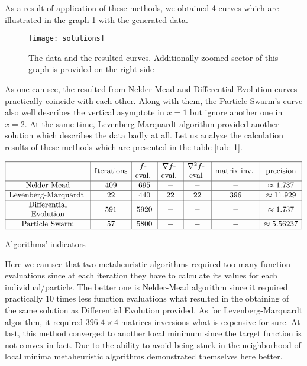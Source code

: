 \documentclass[12pt, bachelor, substylefile = algo_title.rtx]{disser}
\makeatletter
\newcommand{\specialcell}[2][c]{%
  \begin{tabular}[#1]{@{}c@{}}#2\end{tabular}}
\theoremstyle{definition}
\makeatother
\begin{document}
As a result of application of these methods, we obtained 4 curves which are illustrated in the graph \ref{fig: 1} with the generated data.

\begin{figure}[h]
\begin{center}
\texttt{[image: solutions]}
\caption{The data and the resulted curves. Additionally zoomed sector of this graph is provided on the right side}
\label{fig: 1}
\end{center}
\end{figure}
 
As one can see, the resulted from Nelder-Mead and Differential Evolution curves practically coincide with each other. Along with them, the Particle Swarm's curve also well describes the vertical asymptote in $x = 1$ but ignore another one in $x = 2$. At the same time, Levenberg-Marquardt algorithm provided another solution which describes the data badly at all.
Let us analyze the calculation results of these methods which are presented in the table 
\ref{tab: 1}.


\begin{table}[h]
$$
\begin{array}{|c|c|c|c|c|c|c|}
\hline
 & \text{Iterations} & \text{\specialcell{ $f$-\\eval.} }& \text{\specialcell{ $\nabla f$-\\eval.} } & \text{\specialcell{ $\nabla^2 f$-\\eval} } & \text{\specialcell{ matrix inv. } } &\text{precision}\\
\hline
\text{Nelder-Mead} & 409 & 695 & - & - & - & \approx 1.737 \\ 
\hline
\text{\specialcell{ Levenberg-Marquardt } } & 22 & 440 & 22 & 22 & 396 &\approx 11.929 \\
\hline
\text{\specialcell{Differential\\ Evolution}} & 591 & 5920 & - & - & - & \approx 1.737 \\
\hline
\text{Particle Swarm} & 57 & 5800 & - & - & - & \approx 5.56237 \\
\hline
\end{array}
$$
\caption{Algorithms' indicators}
\label{tab: 1}
\end{table}

Here we can see that two metaheuristic algorithms required too many function evaluations since at each iteration they have to calculate its values for each individual/particle. The better one is Nelder-Mead algorithm since it required practically 10 times less function evaluations what resulted in the obtaining of the same solution as Differential Evolution provided. As for Levenberg-Marquardt algorithm, it required $396$ $4 \times 4$-matrices inversions what is expensive for sure. At last, this method converged to another local minimum since the target function is not convex in fact. Due to the ability to avoid being stuck in the neighborhood of local minima metaheuristic algorithms demonstrated themselves here better.
\end{document}
